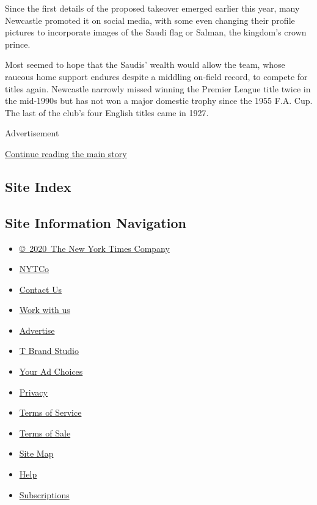 Since the first details of the proposed takeover emerged earlier this
year, many Newcastle promoted it on social media, with some even
changing their profile pictures to incorporate images of the Saudi flag
or Salman, the kingdom's crown prince.

Most seemed to hope that the Saudis' wealth would allow the team, whose
raucous home support endures despite a middling on-field record, to
compete for titles again. Newcastle narrowly missed winning the Premier
League title twice in the mid-1990s but has not won a major domestic
trophy since the 1955 F.A. Cup. The last of the club's four English
titles came in 1927.

Advertisement

\protect\hyperlink{after-bottom}{Continue reading the main story}

\hypertarget{site-index}{%
\subsection{Site Index}\label{site-index}}

\hypertarget{site-information-navigation}{%
\subsection{Site Information
Navigation}\label{site-information-navigation}}

\begin{itemize}
\tightlist
\item
  \href{https://help.nytimes.com/hc/en-us/articles/115014792127-Copyright-notice}{©~2020~The
  New York Times Company}
\end{itemize}

\begin{itemize}
\tightlist
\item
  \href{https://www.nytco.com/}{NYTCo}
\item
  \href{https://help.nytimes.com/hc/en-us/articles/115015385887-Contact-Us}{Contact
  Us}
\item
  \href{https://www.nytco.com/careers/}{Work with us}
\item
  \href{https://nytmediakit.com/}{Advertise}
\item
  \href{http://www.tbrandstudio.com/}{T Brand Studio}
\item
  \href{https://www.nytimes.com/privacy/cookie-policy\#how-do-i-manage-trackers}{Your
  Ad Choices}
\item
  \href{https://www.nytimes.com/privacy}{Privacy}
\item
  \href{https://help.nytimes.com/hc/en-us/articles/115014893428-Terms-of-service}{Terms
  of Service}
\item
  \href{https://help.nytimes.com/hc/en-us/articles/115014893968-Terms-of-sale}{Terms
  of Sale}
\item
  \href{https://spiderbites.nytimes.com}{Site Map}
\item
  \href{https://help.nytimes.com/hc/en-us}{Help}
\item
  \href{https://www.nytimes.com/subscription?campaignId=37WXW}{Subscriptions}
\end{itemize}
